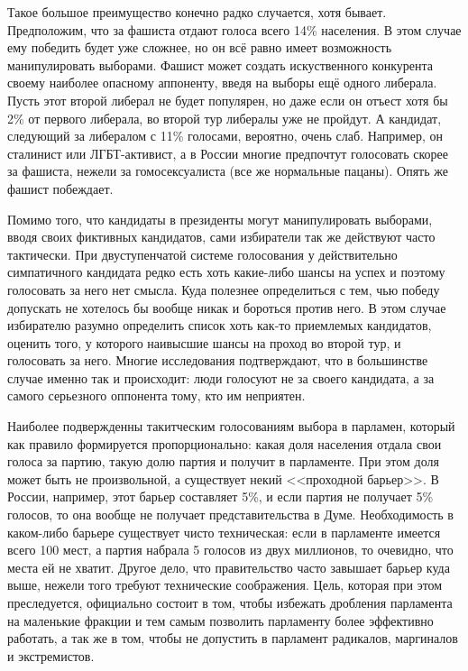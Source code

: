 Такое большое преимущество конечно радко случается, хотя бывает. Предположим, что за фашиста отдают голоса всего 14\% населения. В этом случае ему победить будет уже сложнее, но он всё равно имеет возможность манипулировать выборами. Фашист может создать искуственного конкурента своему наиболее опасному аппоненту, введя на выборы ещё одного либерала. Пусть этот второй либерал не будет популярен, но даже если он отъест хотя бы 2\% от первого либерала, во второй тур либералы уже не пройдут. А кандидат, следующий за либералом с 11\% голосами, вероятно, очень слаб. Например, он сталинист или ЛГБТ-активист, а в России многие предпочтут голосовать скорее за фашиста, нежели за гомосексуалиста (все же нормальные пацаны). Опять же фашист побеждает.

Помимо того, что кандидаты в президенты могут манипулировать выборами, вводя своих фиктивных кандидатов, сами избиратели так же действуют часто тактически. При двуступенчатой системе голосования у действительно симпатичного кандидата редко есть хоть какие-либо шансы на успех и поэтому голосовать за него нет смысла. Куда полезнее определиться с тем, чью победу допускать не хотелось бы вообще никак и бороться против него. В этом случае избирателю разумно определить список хоть как-то приемлемых кандидатов, оценить того, у которого наивысшие шансы на проход во второй тур, и голосовать за него. Многие исследования подтверждают, что в большинстве случае именно так и происходит: люди голосуют не за своего кандидата, а за самого серьезного оппонента тому, кто им неприятен.

Наиболее подвержденны такитческим голосованиям выбора в парламен, который как правило формируется пропорционально: какая доля населения отдала свои голоса за партию, такую долю партия и получит в парламенте. При этом доля может быть не произвольной, а существует некий <<проходной барьер>>. В России, например, этот барьер составляет 5\%, и если партия не получает 5\% голосов, то она вообще не получает представительства в Думе. Необходимость в каком-либо барьере существует чисто техническая: если в парламенте имеется всего 100 мест, а партия набрала 5 голосов из двух миллионов, то очевидно, что места ей не хватит. Другое дело, что правительство часто завышает барьер куда выше, нежели того требуют технические соображения. Цель, которая при этом преследуется, официально состоит в том, чтобы избежать дробления парламента на маленькие фракции и тем самым позволить парламенту более эффективно работать, а так же в том, чтобы не допустить в парламент радикалов, маргиналов и экстремистов.

